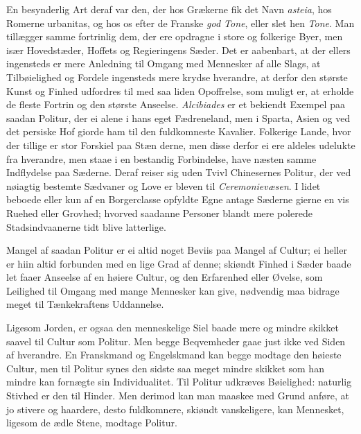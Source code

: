 \documentclass[12pt,a4paper]{article}
\newcommand{\opage}[1]{\marginnote{\footnotesize\textit{[#1]}}}
\begin{document}
En besynderlig Art deraf var den, der hos Grækerne fik det Navn \emph{asteia}, hos
Romerne urbanitas, og hos os efter de Franske \emph{god Tone}, eller slet hen
\emph{Tone}. Man tillægger samme fortrinlig dem, der ere opdragne i store og folkerige
Byer, men især Hovedstæder, Hoffets og Regieringens Sæder. Det er aabenbart, at der ellers
ingensteds er mere Anledning til Omgang med Mennesker af alle Slags, at Tilbøielighed og
Fordele ingensteds mere krydse hverandre, at derfor den største Kunst og Finhed udfordres
til med saa liden Opoffrelse, som muligt er, at erholde de fleste Fortrin og den største
Anseelse. \emph{Alcibiades} er et bekiendt Exempel paa saadan Politur, der ei alene i hans
eget Fædreneland, men i Sparta, Asien og ved det persiske Hof giorde ham til den
fuldkomneste Kavalier. Folkerige Lande, hvor der tillige er stor Forskiel paa Stæn%
\opage{180}derne, men disse derfor ei ere aldeles udelukte fra hverandre, men staae i en bestandig
Forbindelse, have næsten samme Indflydelse paa Sæderne. Deraf reiser sig uden Tvivl
Chinesernes Politur, der ved nøiagtig bestemte Sædvaner og Love er bleven til
\emph{Ceremonievæsen}. I lidet beboede eller kun af en Borgerclasse opfyldte Egne antage
Sæderne gierne en vis Ruehed eller Grovhed; hvorved saadanne Personer blandt mere polerede
Stadsindvaanerne tidt blive latterlige.

Mangel af saadan Politur er ei altid noget Beviis paa Mangel af Cultur; ei heller er hiin
altid forbunden med en lige Grad af denne; skiøndt Finhed i Sæder baade let faaer Anseelse
af en høiere Cultur, og den Erfarenhed eller Øvelse, som Leilighed til Omgang med mange
Mennesker kan give, nødvendig maa bidrage meget til Tænkekraftens Uddannelse.

Ligesom Jorden, er ogsaa den menneskelige Siel baade mere og mindre skikket saavel til
Cultur som Politur. Men begge Beqvemheder gaae just ikke ved Siden af hverandre. En
Franskmand og Engelskmand kan begge modtage den høieste Cultur, men til Politur synes den
sidste saa meget mindre skikket som han mindre kan fornægte sin Individualitet. Til
Politur udkræves Bøielighed: naturlig Stivhed er den til Hinder. Men derimod kan man
maaskee med Grund anføre, at jo stivere og haardere, desto fuldkomnere, skiøndt
vanskeligere,
\opage{181} kan Mennesket, ligesom de ædle Stene, modtage Politur.
\end{document}
